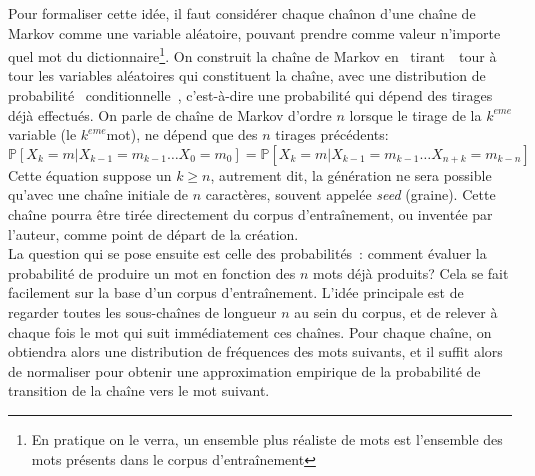 \documentclass{article}
\begin{document}
				Pour formaliser cette idée, il faut considérer chaque chaînon d'une chaîne de Markov comme une variable aléatoire, pouvant prendre comme valeur n'importe quel mot du dictionnaire\footnote{En pratique on le verra, un ensemble plus réaliste de mots est l'ensemble des mots présents dans le corpus d'entraînement}. On construit la chaîne de Markov en \guillemotleft~tirant~\guillemotright~tour à tour les variables aléatoires qui constituent la chaîne, avec une distribution de probabilité \guillemotleft~conditionnelle~\guillemotright, c'est-à-dire une probabilité qui dépend des tirages déjà effectués. On parle de chaîne de Markov d'ordre $n$ lorsque le tirage de la $k^{eme}$ variable (le $k^{eme}$mot), ne dépend que des $n$ tirages précédents:
				\begin{equation}
					\mathbb{P}[X_{k} = m | X_{k-1} = m_{k-1} \dots X_{0} = m_0] = \mathbb{P}[X_k = m | X_{k-1} = m_{k-1} \dots X_{n+k} = m_{k-n}]
				\end{equation}
				Cette équation suppose un $k \geq n$, autrement dit, la génération ne sera possible qu'avec une chaîne initiale de $n$ caractères, souvent appelée \textit{seed} (graine). Cette chaîne pourra être tirée directement du corpus d'entraînement, ou inventée par l'auteur, comme point de départ de la création.\\
				
				La question qui se pose ensuite est celle des probabilités~: comment évaluer la probabilité de produire un mot en fonction des $n$ mots déjà produits? Cela se fait facilement sur la base d'un corpus d'entraînement. L'idée principale est de regarder toutes les sous-chaînes de longueur $n$ au sein du corpus, et de relever à chaque fois le mot qui suit immédiatement ces chaînes. Pour chaque chaîne, on obtiendra alors une distribution de fréquences des mots suivants, et il suffit alors de normaliser pour obtenir une approximation empirique de la probabilité de transition de la chaîne vers le mot suivant.\\
				
\end{document}
